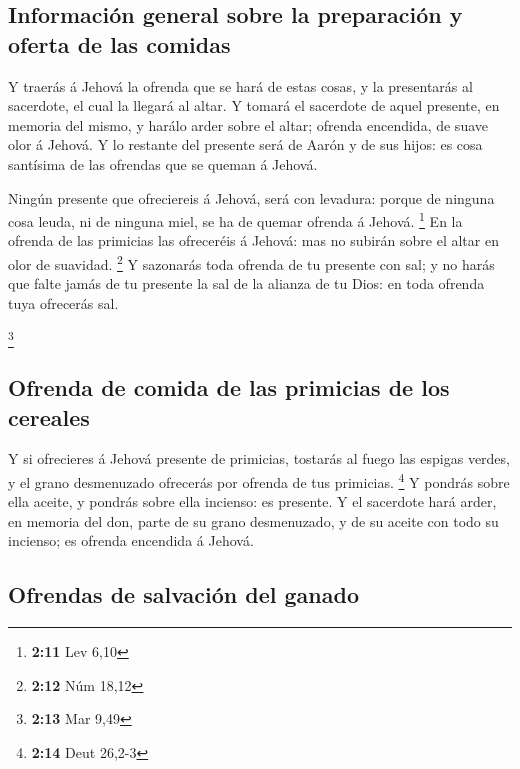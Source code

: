 \hypertarget{informaciuxf3n-general-sobre-la-preparaciuxf3n-y-oferta-de-las-comidas}{%
\subsection{Información general sobre la preparación y oferta de las
comidas}\label{informaciuxf3n-general-sobre-la-preparaciuxf3n-y-oferta-de-las-comidas}}

 Y traerás á Jehová la ofrenda que se hará de estas cosas, y
la presentarás al sacerdote, el cual la llegará al altar.  Y
tomará el sacerdote de aquel presente, en memoria del mismo, y harálo
arder sobre el altar; ofrenda encendida, de suave olor á Jehová.
 Y lo restante del presente será de Aarón y de sus hijos:
es cosa santísima de las ofrendas que se queman á Jehová.

 Ningún presente que ofreciereis á Jehová, será con
levadura: porque de ninguna cosa leuda, ni de ninguna miel, se ha de
quemar ofrenda á Jehová. \footnote{\textbf{2:11} Lev 6,10} 
En la ofrenda de las primicias las ofreceréis á Jehová: mas no subirán
sobre el altar en olor de suavidad. \footnote{\textbf{2:12} Núm 18,12}
 Y sazonarás toda ofrenda de tu presente con sal; y no
harás que falte jamás de tu presente la sal de la alianza de tu Dios: en
toda ofrenda tuya ofrecerás sal.

\footnote{\textbf{2:13} Mar 9,49}

\hypertarget{ofrenda-de-comida-de-las-primicias-de-los-cereales}{%
\subsection{Ofrenda de comida de las primicias de los
cereales}\label{ofrenda-de-comida-de-las-primicias-de-los-cereales}}

 Y si ofrecieres á Jehová presente de primicias, tostarás
al fuego las espigas verdes, y el grano desmenuzado ofrecerás por
ofrenda de tus primicias. \footnote{\textbf{2:14} Deut 26,2-3}
 Y pondrás sobre ella aceite, y pondrás sobre ella
incienso: es presente.  Y el sacerdote hará arder, en
memoria del don, parte de su grano desmenuzado, y de su aceite con todo
su incienso; es ofrenda encendida á Jehová.

\hypertarget{ofrendas-de-salvaciuxf3n-del-ganado}{%
\subsection{Ofrendas de salvación del
ganado}\label{ofrendas-de-salvaciuxf3n-del-ganado}}

